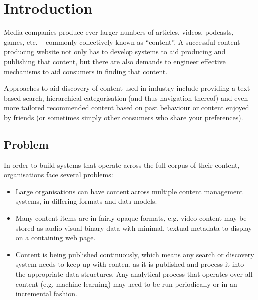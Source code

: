 \documentclass{sig-alternate-05-2015}
\begin{document}

\section{Introduction}

Media companies produce ever larger numbers of articles, videos, podcasts,
games, etc. -- commonly collectively known as ``content''. A successful
content-producing website not only has to develop systems to aid producing and
publishing that content, but there are also demands to engineer effective
mechanisms to aid consumers in finding that content.

Approaches to aid discovery of content used in industry include providing a
text-based search, hierarchical
categorisation (and thus navigation thereof) and even more tailored recommended
content based on past behaviour or content enjoyed by friends (or sometimes
simply other consumers who share your preferences).

\subsection{Problem}

In order to build systems
that operate across the full corpus of their content, organisations face
several problems:

\begin{itemize}

\item Large organisations can have content across multiple content management
systems, in differing formats and data models.

\item Many content items are in fairly opaque formats, e.g. video content may be
stored as audio-visual binary data with minimal, textual metadata to display on
a containing web page.

\item Content is being published continuously, which means any search or
discovery system needs to keep up with content as it is published and process it
into the appropriate data structures. Any analytical process that operates
over all content (e.g. machine learning) may need to be run periodically or in
an incremental fashion.

\end{itemize}
\end{document}
